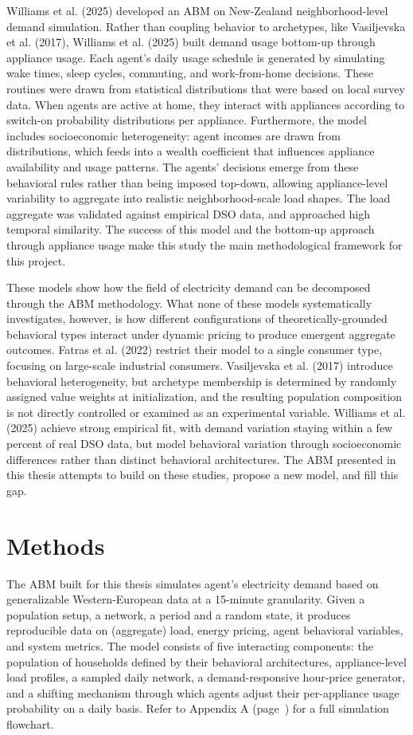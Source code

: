 \documentclass[11pt, a4paper]{article}
\begin{document}
Williams et al. (2025) developed an ABM on New-Zealand neighborhood-level demand simulation. Rather than coupling behavior to archetypes, like Vasiljevska et al. (2017), Williams et al. (2025) built demand usage bottom-up through appliance usage. Each agent's daily usage schedule is generated by simulating wake times, sleep cycles, commuting, and work-from-home decisions. These routines were drawn from statistical distributions that were based on local survey data. When agents are active at home, they interact with appliances according to switch-on probability distributions per appliance. Furthermore, the model includes socioeconomic heterogeneity: agent incomes are drawn from distributions, which feeds into a wealth coefficient that influences appliance availability and usage patterns. The agents' decisions emerge from these behavioral rules rather than being imposed top-down, allowing appliance-level variability to aggregate into realistic neighborhood-scale load shapes. The load aggregate was validated against empirical DSO data, and approached high temporal similarity. The success of this model and the bottom-up approach through appliance usage make this study the main methodological framework for this project.

These models show how the field of electricity demand can be decomposed through the ABM methodology. What none of these models systematically investigates, however, is how different configurations of theoretically-grounded behavioral types interact under dynamic pricing to produce emergent aggregate outcomes. Fatras et al. (2022) restrict their model to a single consumer type, focusing on large-scale industrial consumers. Vasiljevska et al. (2017) introduce behavioral heterogeneity, but archetype membership is determined by randomly assigned value weights at initialization, and the resulting population composition is not directly controlled or examined as an experimental variable. Williams et al. (2025) achieve strong empirical fit, with demand variation staying within a few percent of real DSO data, but model behavioral variation through socioeconomic differences rather than distinct behavioral architectures. The ABM presented in this thesis attempts to build on these studies, propose a new model, and fill this gap. 

\section{Methods} \label{sec:Methods}

The ABM built for this thesis simulates agent's electricity demand based on generalizable Western-European data at a 15-minute granularity. Given a population setup, a network, a period and a random state, it produces reproducible data on (aggregate) load, energy pricing, agent behavioral variables, and system metrics. The model consists of five interacting components: the population of households defined by their behavioral architectures, appliance-level load profiles, a sampled daily network, a demand-responsive hour-price generator, and a shifting mechanism through which agents adjust their per-appliance usage probability on a daily basis. Refer to Appendix A (page~\pageref{app:a}) for a full simulation flowchart.
\end{document}

